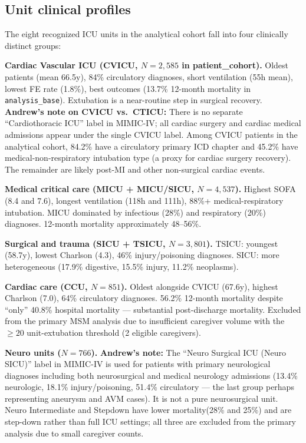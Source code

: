 \documentclass[11pt]{article}
\begin{document}
\subsection{Unit clinical profiles}

The eight recognized ICU units in the analytical cohort fall into four
clinically distinct groups:

\textbf{Cardiac Vascular ICU (CVICU, $N=2{,}585$ in patient\_cohort).} Oldest patients (mean 66.5y), 84\% circulatory diagnoses, short ventilation (55h mean), lowest FE rate (1.8\%), best outcomes (13.7\% 12-month mortality in \texttt{analysis\_base}). Extubation is a near-routine step in surgical recovery.
\textbf{Andrew's note on CVICU vs.\ CTICU:} There is no separate
``Cardiothoracic ICU'' label in MIMIC-IV; all cardiac surgery and cardiac medical admissions appear under the single CVICU label. Among CVICU patients in the analytical cohort, 84.2\% have a circulatory primary ICD chapter and 45.2\% have medical-non-respiratory intubation type (a proxy for cardiac surgery recovery). The remainder are likely post-MI and other non-surgical cardiac events.

\textbf{Medical critical care (MICU + MICU/SICU, $N=4{,}537$).} Highest SOFA (8.4 and 7.6), longest ventilation (118h and 111h), 88\%+ medical-respiratory intubation. MICU dominated by infectious (28\%) and respiratory (20\%) diagnoses. 12-month mortality approximately 48--56\%.

\textbf{Surgical and trauma (SICU + TSICU, $N=3{,}801$).} TSICU: youngest (58.7y), lowest Charlson (4.3), 46\% injury/poisoning diagnoses. SICU: more heterogeneous (17.9\% digestive, 15.5\% injury, 11.2\% neoplasms).

\textbf{Cardiac care (CCU, $N=851$).} Oldest alongside CVICU (67.6y), highest Charlson (7.0), 64\% circulatory diagnoses. 56.2\% 12-month mortality despite ``only'' 40.8\% hospital mortality --- substantial post-discharge mortality. Excluded from the primary MSM analysis due to insufficient caregiver volume with the $\geq 20$ unit-extubation threshold (2 eligible caregivers).

\textbf{Neuro units ($N=766$).} \textbf{Andrew's note:} The ``Neuro Surgical ICU (Neuro SICU)'' label in MIMIC-IV is used for patients with primary neurological diagnoses including both neurosurgical and medical neurology admissions (13.4\% neurologic, 18.1\% injury/poisoning, 51.4\% circulatory --- the last group perhaps representing aneurysm and AVM cases). It is not a pure neurosurgical unit. Neuro Intermediate and Stepdown have lower mortality(28\% and 25\%) and are step-down rather than full ICU settings; all three are excluded from the primary analysis due to small caregiver counts.
\end{document}
